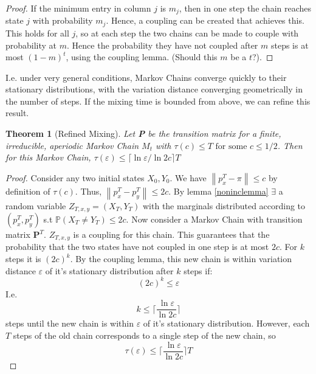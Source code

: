 \documentclass[11pt]{article}
\newcommand{\norm}[1]{\left\lVert#1\right\rVert}
\newtheorem{thm}{Theorem}[section]
\begin{document}
\begin{proof}
If the minimum entry in column \(j\) is \(m_j\), then in one step the chain reaches state \(j\) with probability \(m_j\). Hence, a coupling can be created that achieves this. This holds for all \(j\), so at each step the two chains can be made to couple with probability at \(m\). Hence the probability they have not coupled after \(m\) steps is at most \(\left(1-m\right)^t\), using the coupling lemma. (Should this \(m\) be a \(t\)?).
\end{proof}

I.e. under very general conditions, Markov Chains converge quickly to their stationary distributions, with the variation distance converging geometrically in the number of steps. If the mixing time is bounded from above, we can refine this result.

\begin{thm}[Refined Mixing]
Let \textbf{P} be the transition matrix for a finite, irreducible, aperiodic Markov Chain \(M_t\) with \(\tau\left(c\right) \leq T \text{ for some } c\leq 1/2\). Then for this Markov Chain, \(\tau\left(\varepsilon\right) \leq \lceil \ln{\varepsilon}/\ln{2c}\rceil T \)
\end{thm}
\begin{proof}
Consider any two initial states \(X_0,Y_0\). We have \(\norm{p_x^T - \pi} \leq c\) by definition of \(\tau\left(c\right)\). Thus, \(\norm{p_x^T - p_y^T} \leq 2c\). By lemma \ref{noninclemma} \(\exists\) a random variable \(Z_{T,x,y} = \left(X_T,Y_T\right)\) with the marginals distributed according to \( \left(p_x^T,p_y^T\right) \) s.t \( \mathbb{P}\left(X_T \neq Y_T\right) \leq 2c \).
Now consider a Markov Chain with transition matrix \( \textbf{P}^T \). \( Z_{T,x,y}\) is a coupling for this chain. This guarantees that the probability that the two states have not coupled in one step is at most \(2c\). For \(k\) steps it is \(\left(2c\right)^k\). By the coupling lemma, this new chain is within variation distance \(\varepsilon\) of it's stationary distribution after \(k\) steps if:
\begin{equation}
\left(2c\right)^k \leq \varepsilon
\end{equation}
I.e.
\begin{equation}
k \leq \lceil \frac{\ln{\varepsilon}}{\ln{2c}}\rceil
\end{equation}
steps until the new chain is within \(\varepsilon\) of it's stationary distribution. However, each \(T\) steps of the old chain corresponds to a single step of the new chain, so
\begin{equation}
\tau\left(\varepsilon\right) \leq \lceil \frac{\ln{\varepsilon}}{\ln{2c}}\rceil T
\end{equation}
\end{proof}
\end{document}
